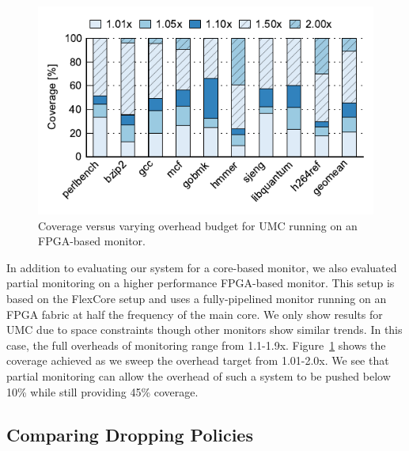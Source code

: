 \begin{figure}
  \begin{center}
    \vspace{-0.1in}
    \includegraphics[width=\linewidth]{figs/data_fpga_umc_sweep.pdf}
    \vspace{-0.2in}
    \caption{Coverage versus varying overhead budget for UMC running on an FPGA-based monitor.}
    \label{fig:evaluation.fpga_umc_sweep}
    \vspace{-0.1in}
  \end{center}
\end{figure}

In addition to evaluating our system for a core-based monitor, we also
evaluated partial monitoring on a higher performance FPGA-based monitor. This
setup is based on the FlexCore \cite{flexcore-micro10} setup and uses a
fully-pipelined monitor running on an FPGA fabric at half the frequency of the
main core. We only show results for UMC due to space constraints though other
monitors show similar trends. In this case, the full overheads of
monitoring range from 1.1-1.9x. Figure~\ref{fig:evaluation.fpga_umc_sweep} shows
the coverage achieved as we sweep the overhead target from 1.01-2.0x. We see that partial
monitoring can allow the overhead of such a system to be pushed below 10\%
while still providing 45\% coverage.

\subsection{Comparing Dropping Policies}

